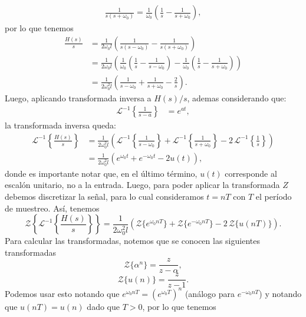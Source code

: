 \documentclass[
  11pt,
  letterpaper,
   addpoints,
  answers
  ]{exam}
\begin{document}
\begin{questions}
\begin{solution}
\begin{align}
\frac{1}{s(s+\omega_0)}=\frac{1}{\omega_0}\left(\frac{1}{s}-\frac{1}{s+\omega_0}\right),
\end{align}
por lo que tenemos
\begin{align}
\frac{H(s)}{s}
&=\frac{1}{2\omega_0 l}
\left(
\frac{1}{s(s-\omega_0)}-\frac{1}{s(s+\omega_0)}
\right)\\
&=\frac{1}{2\omega_0 l}
\left(
\frac{1}{\omega_0}\left(\frac{1}{s}-\frac{1}{s-\omega_0}\right)
-\frac{1}{\omega_0}\left(\frac{1}{s}-\frac{1}{s+\omega_0}\right)
\right)\\
&=\frac{1}{2\omega_0^{2} l}
\left(
\frac{1}{s-\omega_0}+\frac{1}{s+\omega_0}-\frac{2}{s}
\right).
\end{align}
Luego, aplicando transformada inversa a $H(s)/s$, ademas considerando que:
\begin{align}
\mathcal{L}^{-1}\!\left\{\frac{1}{s-a}\right\}&=e^{at},
\end{align}
  la transformada inversa queda:
\begin{align}
\mathcal{L}^{-1}\!\left\{\frac{H(s)}{s}\right\}
&=\frac{1}{2\omega_0^{2} l}
\left(
\mathcal{L}^{-1}\!\left\{\frac{1}{s-\omega_0}\right\}
+\mathcal{L}^{-1}\!\left\{\frac{1}{s+\omega_0}\right\}
-2\,\mathcal{L}^{-1}\!\left\{\frac{1}{s}\right\}
\right)\\
&=\frac{1}{2\omega_0^{2} l}\left(e^{\omega_0 t}+e^{-\omega_0 t}-2u(t)\right),
\end{align}
donde es importante notar que, en el último término, $u(t)$ corresponde al escalón unitario, no a la entrada. Luego, para poder aplicar la transformada $Z$ debemos discretizar la señal, para lo cual consideramos $t=nT$ con $T$ el período de muestreo. Así, tenemos
\begin{equation}
\mathcal{Z}\!\left\{\mathcal{L}^{-1}\!\left\{\frac{H(s)}{s}\right\}\right\}
=\frac{1}{2\omega_0^{2} l}\left(
\mathcal{Z}\{e^{\omega_0 nT}\}
+\mathcal{Z}\{e^{-\omega_0 nT}\}
-2\,\mathcal{Z}\{u(nT)\}
\right).
\end{equation}
Para calcular las transformadas, notemos que se conocen las siguientes transformadas
\begin{equation}
\mathcal{Z}\{\alpha^n\}=\frac{z}{z-\alpha},
\end{equation}
\begin{equation}
\mathcal{Z}\{u(n)\}=\frac{z}{z-1}.
\end{equation}
Podemos usar esto notando que $e^{\omega_0 nT}=(e^{\omega_0 T})^n$ (análogo para $e^{-\omega_0 nT}$) y notando que $u(nT)=u(n)$ dado que $T>0$, por lo que tenemos
\begin{equation}

\end{equation}
\end{solution}
\end{questions}
\end{document}
